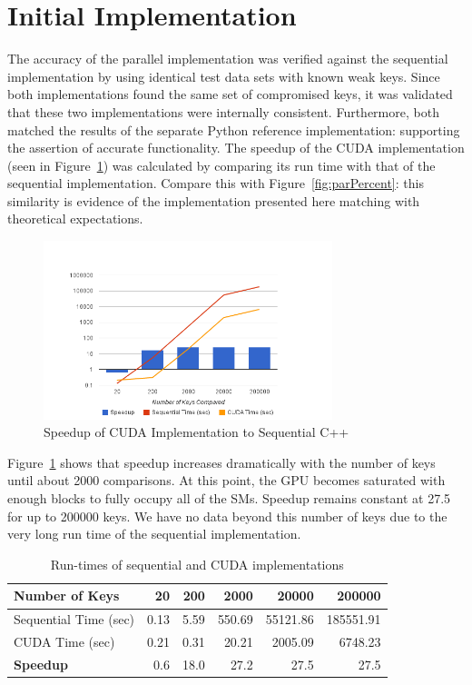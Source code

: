 \documentclass[12pt]{ucthesis}
\begin{document}
\section{Initial Implementation}
\label{subsec:initimpl}
The accuracy of the parallel implementation was verified against the 
sequential implementation by using identical test data sets with known 
weak keys. Since both implementations found the same set of compromised keys,
it was validated that these two implementations 
were internally consistent. Furthermore, both matched the results of the 
separate Python reference implementation: supporting the assertion of accurate 
functionality. The speedup of the CUDA implementation (seen in
Figure~\ref{fig:speedup}) was calculated by comparing its run time with that
of the sequential implementation. Compare this with Figure~\ref{fig:parPercent}:
this similarity is evidence of the implementation presented here matching
with theoretical expectations.

\begin{figure}
   \centering
   \includegraphics[width=0.75\textwidth]{chart_1}
   \caption{Speedup of CUDA Implementation to Sequential C++}
   \label{fig:speedup}
\end{figure}

Figure~\ref{fig:speedup} shows that speedup increases dramatically with 
the number of keys until about 2000 comparisons. At this point, the GPU
becomes saturated with enough blocks to fully occupy all of the SMs. Speedup
remains constant at 27.5 for up to 200000 keys. We have no data beyond this
number of keys due to the very long run time of the sequential implementation. 

\begin{table}
   \centering
   \begin{tabular}{|l|*{5}{r}|}\hline
      Number of Keys        & 20   & 200  & 2000   & 20000    & 200000 \\ \hline
      Sequential Time (sec) & 0.13 & 5.59 & 550.69 & 55121.86 & 185551.91\\
      CUDA Time (sec)       & 0.21 & 0.31 & 20.21  & 2005.09  & 6748.23\\\hline
      \textbf{Speedup}      & 0.6  & 18.0 & 27.2   & 27.5     & 27.5\\\hline
   \end{tabular}
   \caption{Run-times of sequential and CUDA implementations}
   \label{tab:runtimes}
\end{table}
\end{document}
